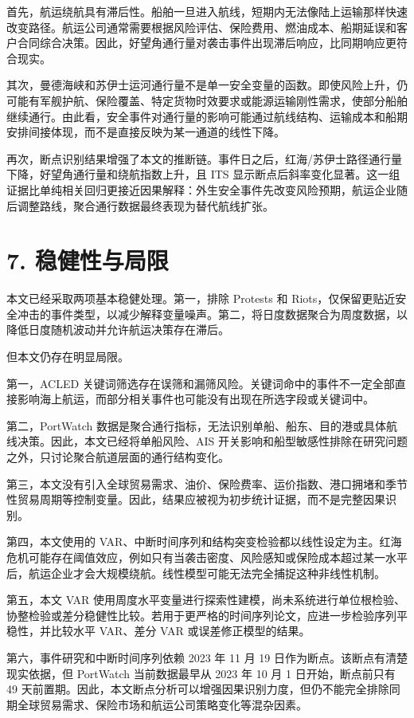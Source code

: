 \documentclass[
]{ctexart}
\begin{document}
首先，航运绕航具有滞后性。船舶一旦进入航线，短期内无法像陆上运输那样快速改变路径。航运公司通常需要根据风险评估、保险费用、燃油成本、船期延误和客户合同综合决策。因此，好望角通行量对袭击事件出现滞后响应，比同期响应更符合现实。

其次，曼德海峡和苏伊士运河通行量不是单一安全变量的函数。即使风险上升，仍可能有军舰护航、保险覆盖、特定货物时效要求或能源运输刚性需求，使部分船舶继续通行。由此看，安全事件对通行量的影响可能通过航线结构、运输成本和船期安排间接体现，而不是直接反映为某一通道的线性下降。

再次，断点识别结果增强了本文的推断链。事件日之后，红海/苏伊士路径通行量下降，好望角通行量和绕航指数上升，且
ITS
显示断点后斜率变化显著。这一组证据比单纯相关回归更接近因果解释：外生安全事件先改变风险预期，航运企业随后调整路线，聚合通行数据最终表现为替代航线扩张。

\section{7. 稳健性与局限}\label{ux7a33ux5065ux6027ux4e0eux5c40ux9650}

本文已经采取两项基本稳健处理。第一，排除 Protests 和
Riots，仅保留更贴近安全冲击的事件类型，以减少解释变量噪声。第二，将日度数据聚合为周度数据，以降低日度随机波动并允许航运决策存在滞后。

但本文仍存在明显局限。

第一，ACLED
关键词筛选存在误筛和漏筛风险。关键词命中的事件不一定全部直接影响海上航运，而部分相关事件也可能没有出现在所选字段或关键词中。

第二，PortWatch
数据是聚合通行指标，无法识别单船、船东、目的港或具体航线决策。因此，本文已经将单船风险、AIS
开关影响和船型敏感性排除在研究问题之外，只讨论聚合航道层面的通行结构变化。

第三，本文没有引入全球贸易需求、油价、保险费率、运价指数、港口拥堵和季节性贸易周期等控制变量。因此，结果应被视为初步统计证据，而不是完整因果识别。

第四，本文使用的
VAR、中断时间序列和结构突变检验都以线性设定为主。红海危机可能存在阈值效应，例如只有当袭击密度、风险感知或保险成本超过某一水平后，航运企业才会大规模绕航。线性模型可能无法完全捕捉这种非线性机制。

第五，本文 VAR
使用周度水平变量进行探索性建模，尚未系统进行单位根检验、协整检验或差分稳健性比较。若用于更严格的时间序列论文，应进一步检验序列平稳性，并比较水平
VAR、差分 VAR 或误差修正模型的结果。

第六，事件研究和中断时间序列依赖 2023 年 11 月 19
日作为断点。该断点有清楚现实依据，但 PortWatch 当前数据最早从 2023 年 10
月 1 日开始，断点前只有 49
天前置期。因此，本文断点分析可以增强因果识别力度，但仍不能完全排除同期全球贸易需求、保险市场和航运公司策略变化等混杂因素。
\end{document}
